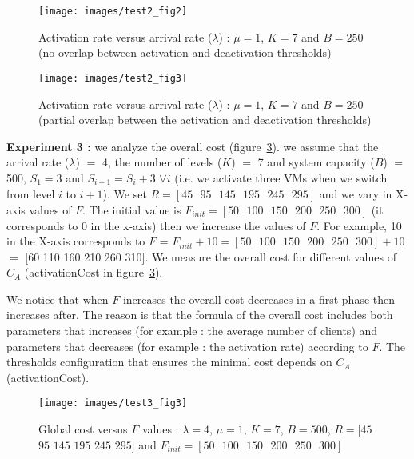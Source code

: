 \documentclass[conference]{IEEEtran}
\begin{document}
\begin{figure}[!t]
\centering
\texttt{[image: images/test2\_fig2]}
\caption{Activation rate versus arrival rate ($\lambda$) : $\mu=1$, $K=7$ and $B=250$ (no overlap between activation and deactivation thresholds)}
\label{fig:image-chap4-1_par_1_test2_fig2}
\end{figure}

\begin{figure}[!t]
\centering
\texttt{[image: images/test2\_fig3]}
\caption{Activation rate versus arrival rate ($\lambda$) : $\mu=1$, $K=7$ and $B=250$ (partial overlap between the activation and deactivation thresholds)}
\label{fig:image-chap4-1_par_1_test2_fig3}
\end{figure}


\textbf{Experiment 3 :} we analyze the overall cost (figure~\ref{fig:image-chap4-1_par_1_test3_fig3}). we assume that the arrival rate ($\lambda$) $=$ 4, the number of levels ($K$) $=$ 7 and system capacity ($B$) $=$ 500, $S_{1}=3$ and $S_{i+1}=S_{i}+3$ $\forall i$ (i.e. we activate three VMs when we switch from level $i$ to $i+1$). We set $R=[45\mbox{ }95\mbox{ }145\mbox{ }195\mbox{ }245\mbox{ }295]$ and we vary in X-axis values of $F$. The initial value is $F_{init}=[50\mbox{ }100\mbox{ }150\mbox{ }200\mbox{ }250\mbox{ }300]$ (it corresponds to 0 in the x-axis) then we increase the values of $F$. For example, 10 in the X-axis corresponds to $F$ = $F_{init}+10=[50\mbox{ }100\mbox{ }150\mbox{ }200\mbox{ }250\mbox{ }300]+10$ $=$ [60 110 160 210 260 310]. We measure the overall cost for different values of $C_{A}$ (activationCost in figure~\ref{fig:image-chap4-1_par_1_test3_fig3}). 

We notice that when $F$ increases the overall cost decreases in a first phase then increases after. The reason is that the formula of the overall cost includes both parameters that increases (for example : the average number of clients) and parameters that decreases (for example : the activation rate) according to $F$. The thresholds configuration that ensures the minimal cost depends on $C_{A}$ (activationCost). 

\begin{figure}[!t]
\centering
\texttt{[image: images/test3\_fig3]}
\caption{Global cost versus $F$ values : $\lambda=4$,  $\mu=1$, $K=7$, $B=500$, $R=[45$ $95$ $145$ $195$ $245$ $295]$ and $F_{init}=[50\mbox{ }100\mbox{ }150\mbox{ }200\mbox{ }250\mbox{ }300]$}
\label{fig:image-chap4-1_par_1_test3_fig3}
\end{figure}
\end{document}
